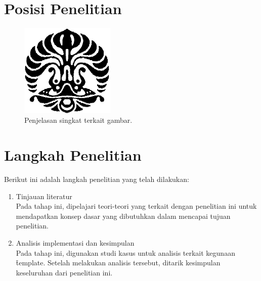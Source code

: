 \section{Posisi Penelitian}

\begin{figure}
	\centering
	\includegraphics[width=0.4\textwidth]{pics/makara.png}
	\caption{Penjelasan singkat terkait gambar.}
	\label{fig:research_position}
\end{figure}



\section{Langkah Penelitian}
Berikut ini adalah langkah penelitian yang telah dilakukan:
\begin{enumerate}
	\item Tinjauan literatur \\
	Pada tahap ini, dipelajari teori-teori yang terkait dengan penelitian ini
	untuk mendapatkan konsep dasar yang dibutuhkan dalam mencapai tujuan
	penelitian.
	\item Analisis implementasi dan kesimpulan \\
	Pada tahap ini, digunakan studi kasus untuk analisis terkait kegunaan
	\f{template}. Setelah melakukan analisis tersebut, ditarik kesimpulan
	keseluruhan dari penelitian ini.
\end{enumerate}


